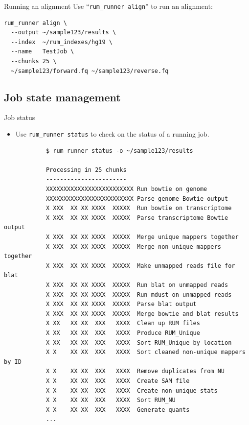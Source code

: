 \documentclass{beamer}
\begin{document}
\begin{frame}[fragile]{Running an alignment}
Use ``\texttt{rum\_runner align}'' to run an alignment:
\begin{verbatim}
rum_runner align \
  --output ~/sample123/results \
  --index  ~/rum_indexes/hg19 \
  --name   TestJob \
  --chunks 25 \
  ~/sample123/forward.fq ~/sample123/reverse.fq
\end{verbatim}
\end{frame}

\subsection{Job state management}

\begin{frame}[fragile]{Job status}
  \begin{itemize}
  \item Use \texttt{rum\_runner status} to check on the status of a
    running job.
  \end{itemize}
  \tiny
\begin{verbatim}
            $ rum_runner status -o ~/sample123/results
            
            Processing in 25 chunks
            -----------------------
            XXXXXXXXXXXXXXXXXXXXXXXXX Run bowtie on genome
            XXXXXXXXXXXXXXXXXXXXXXXXX Parse genome Bowtie output
            X XXX  XX XX XXXX  XXXXX  Run bowtie on transcriptome
            X XXX  XX XX XXXX  XXXXX  Parse transcriptome Bowtie output
            X XXX  XX XX XXXX  XXXXX  Merge unique mappers together
            X XXX  XX XX XXXX  XXXXX  Merge non-unique mappers together
            X XXX  XX XX XXXX  XXXXX  Make unmapped reads file for blat
            X XXX  XX XX XXXX  XXXXX  Run blat on unmapped reads
            X XXX  XX XX XXXX  XXXXX  Run mdust on unmapped reads
            X XXX  XX XX XXXX  XXXXX  Parse blat output
            X XXX  XX XX XXXX  XXXXX  Merge bowtie and blat results
            X XX   XX XX  XXX   XXXX  Clean up RUM files
            X XX   XX XX  XXX   XXXX  Produce RUM_Unique
            X XX   XX XX  XXX   XXXX  Sort RUM_Unique by location
            X X    XX XX  XXX   XXXX  Sort cleaned non-unique mappers by ID
            X X    XX XX  XXX   XXXX  Remove duplicates from NU
            X X    XX XX  XXX   XXXX  Create SAM file
            X X    XX XX  XXX   XXXX  Create non-unique stats
            X X    XX XX  XXX   XXXX  Sort RUM_NU
            X X    XX XX  XXX   XXXX  Generate quants
            ...
\end{verbatim}
\end{frame}
\end{document}
